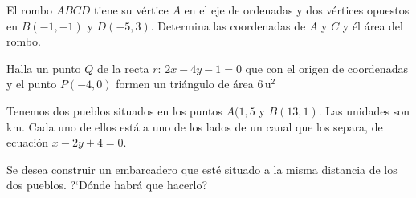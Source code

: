 \vspace{-8mm}
\begin{flushright}
\begin{footnotesize} \textcolor{gris}{}	\end{footnotesize}
\end{flushright}

\begin{mipropuesto}

El rombo $ABCD$ tiene su vértice $A$ en el eje de ordenadas y dos  vértices opuestos en $B(-1,-1)$ y $D(-5,3)$. Determina las coordenadas de $A$ y $C$ y él área del rombo.

\end{mipropuesto}

\vspace{-8mm}
\begin{flushright}
\begin{footnotesize} \textcolor{gris}{}	\end{footnotesize}
\end{flushright}

\begin{mipropuesto}

Halla un punto $Q$ de la recta $r:\, 2x-4y-1=0$ que con el origen de coordenadas y el punto $P(-4,0)$ formen un triángulo de área $6\, \mathrm{u}^2$

\end{mipropuesto}

\vspace{-8mm}
\begin{flushright}
\begin{footnotesize} \textcolor{gris}{}	\end{footnotesize}
\end{flushright}


\begin{mipropuesto}

Tenemos dos pueblos situados en los puntos $A(1,5$ y $B(13,1)$. Las unidades son km. Cada uno de ellos está a uno de los lados de un canal que los separa, de ecuación $x-2y+4=0$.

\vspace{2mm} Se desea construir un embarcadero que esté situado a la misma distancia de los dos pueblos. ?`Dónde habrá que hacerlo?

\end{mipropuesto}

